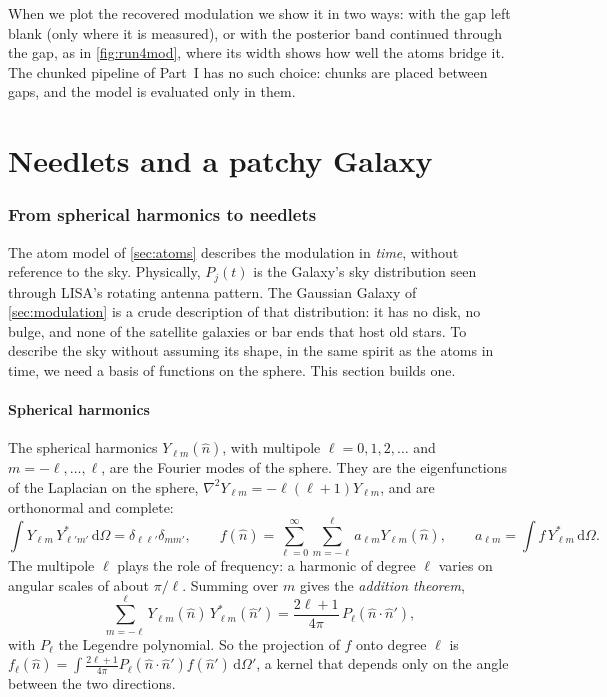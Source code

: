 \documentclass[11pt,a4paper]{article}
\newcommand{\dd}{\mathrm{d}}
\begin{document}
When we plot the recovered modulation we show it in two ways: with the gap left blank
(only where it is measured), or with the posterior band continued through the gap, as
in \cref{fig:run4mod}, where its width shows how well the atoms bridge it. The chunked
pipeline of Part~I has no such choice: chunks are placed between gaps, and the model
is evaluated only in them.

\clearpage
\part{Needlets and a patchy Galaxy}

\section{From spherical harmonics to needlets}\label{sec:needlets}

The atom model of \cref{sec:atoms} describes the modulation in \emph{time}, without
reference to the sky. Physically, $P_j(t)$ is the Galaxy's sky distribution seen
through LISA's rotating antenna pattern. The Gaussian Galaxy of \cref{sec:modulation}
is a crude description of that distribution: it has no disk, no bulge, and none of the
satellite galaxies or bar ends that host old stars. To describe the sky without
assuming its shape, in the same spirit as the atoms in time, we need a basis of
functions on the sphere. This section builds one.

\subsection{Spherical harmonics}

The spherical harmonics $Y_{\ell m}(\hat n)$, with multipole $\ell=0,1,2,\dots$ and
$m=-\ell,\dots,\ell$, are the Fourier modes of the sphere. They are the eigenfunctions
of the Laplacian on the sphere, $\nabla^2Y_{\ell m}=-\ell(\ell+1)Y_{\ell m}$, and are
orthonormal and complete:
\begin{equation}
  \int Y_{\ell m}\,Y^*_{\ell'm'}\,\dd\Omega = \delta_{\ell\ell'}\delta_{mm'},\qquad
  f(\hat n) = \sum_{\ell=0}^\infty\sum_{m=-\ell}^{\ell}a_{\ell m}Y_{\ell m}(\hat n),\qquad
  a_{\ell m} = \int f\,Y^*_{\ell m}\,\dd\Omega .
\end{equation}
The multipole $\ell$ plays the role of frequency: a harmonic of degree $\ell$ varies on
angular scales of about $\pi/\ell$. Summing over $m$ gives the \emph{addition
theorem},
\begin{equation}
  \sum_{m=-\ell}^{\ell}Y_{\ell m}(\hat n)\,Y^*_{\ell m}(\hat n')
  = \frac{2\ell+1}{4\pi}\,P_\ell(\hat n\cdot\hat n'),
  \label{eq:addition}
\end{equation}
with $P_\ell$ the Legendre polynomial. So the projection of $f$ onto degree $\ell$ is
$f_\ell(\hat n)=\int\frac{2\ell+1}{4\pi}P_\ell(\hat n\cdot\hat n')f(\hat n')\,\dd\Omega'$,
a kernel that depends only on the angle between the two directions.
\end{document}
